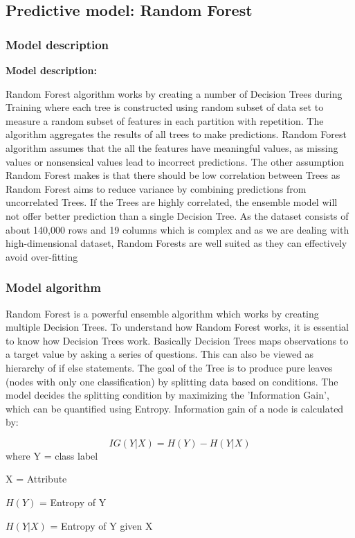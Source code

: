 \documentclass[10pt]{article}
\begin{document}
\subsection{Predictive model: Random Forest}
\subsubsection{Model description}

\textbf{Model description: }

Random Forest algorithm works by creating a number of Decision Trees during Training where each tree is constructed using random subset of data set to measure a random subset of features in each partition with repetition. The algorithm aggregates the results of all trees to make predictions.
Random Forest algorithm assumes that the all the features have meaningful values, as missing values or nonsensical values lead to incorrect predictions. The other assumption Random Forest makes is that there should be low correlation between Trees as Random Forest aims to reduce variance by combining predictions from uncorrelated Trees. If the Trees are highly correlated, the ensemble model will not offer better prediction than a single Decision Tree.
As the dataset consists of about 140,000 rows and 19 columns which is complex and as we are dealing with high-dimensional dataset, Random Forests are well suited as they can effectively avoid over-fitting 
\subsubsection{Model algorithm}

Random Forest is a powerful ensemble algorithm which works by creating multiple Decision Trees. To understand how Random Forest works, it is essential to know how Decision Trees work. 
Basically Decision Trees maps observations to a target value by asking a series of questions. This can also be viewed as hierarchy of if else statements. The goal of the Tree is to produce pure leaves (nodes with only one classification) by splitting data based on conditions. The model decides the splitting condition by maximizing the 'Information Gain', which can be quantified using Entropy.
Information gain of a node is calculated by:

\[IG(Y|X) = H(Y) - H(Y|X)\]
where Y = class label

X = Attribute

\(H(Y)\) = Entropy of Y

\(H(Y|X)\) = Entropy of Y given X
\end{document}
